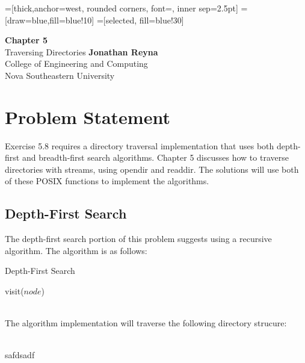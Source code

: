 \documentclass[12pt,sffamily]{article}
\begin{document}
=[thick,anchor=west, rounded corners, font={\scriptsize\ttfamily}, inner sep=2.5pt]
=[draw=blue,fill=blue!10]
=[selected, fill=blue!30]

\begin{titlepage}
    \begin{center}
        \vspace*{1cm}
        \Huge
        \textbf{Chapter 5}\\
        \vspace{0.5cm}
        \LARGE
        Traversing Directories
        \vfill
        \Large
        \textbf{Jonathan Reyna}\\
        College of Engineering and Computing\\
        Nova Southeastern University\\
        \usdate{\today}
    \end{center}
\end{titlepage}

\section{Problem Statement}
Exercise 5.8 requires a directory traversal implementation that uses both depth-first and breadth-first search algorithms. Chapter 5 discusses how to traverse directories with streams, using opendir and readdir. The solutions will use both of these POSIX functions to implement the algorithms.
\subsection{Depth-First Search}
The depth-first search portion of this problem suggests using a recursive algorithm. The algorithm is as follows:
\begin{algorithm}
	\caption{Depth-First Search}
	\label{depthfirst}
	\begin{algorithmic}[1]
		\State visit($node$)
		\State{}
		\EndIf
		\EndFor
		\EndProcedure
	\end{algorithmic}
\end{algorithm}\\
The algorithm implementation will traverse the following directory strucure:\\
\\
safdsadf
\end{document}
